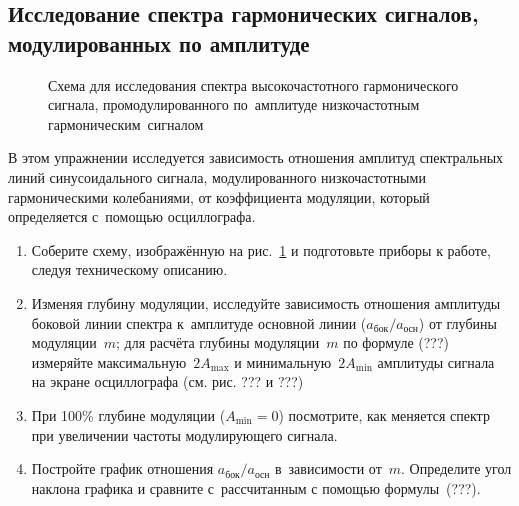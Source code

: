 \subsection*{Исследование спектра гармонических сигналов, модулированных по амплитуде}

%

\begin{figure}
	\hfill
	\hspace*{\fill}
	\label{fig:614}
	\caption{Схема для исследования спектра высокочастотного гармонического сигнала, промодулированного по~амплитуде низкочастотным гармоническим~сигналом}
\end{figure}

\begin{lab:task}
	В этом упражнении исследуется зависимость отношения амплитуд спектральных линий синусоидального сигнала, модулированного низкочастотными гармоническими колебаниями, от коэффициента модуляции, который определяется с~помощью осциллографа.
	\begin{enumerate}
		\item Соберите схему, изображённую на рис.~\ref{fig:614} и подготовьте приборы к работе, следуя техническому описанию.
		\item Изменяя глубину модуляции, исследуйте зависимость отношения амплитуды боковой линии спектра к~амплитуде основной линии ($a_{бок}/a_{осн}$) от глубины модуляции~$m$; для расчёта глубины модуляции~$m$ по формуле (???)
		измеряйте максимальную~$2A_{\max}$ и минимальную~$2A_{\min}$ амплитуды сигнала на экране осциллографа (см. рис. ??? и ???)
		\item При 100\% глубине модуляции ($A_{\min}=0$) посмотрите, как меняется спектр при увеличении частоты модулирующего сигнала.
		\item Постройте график отношения $a_{бок}/a_{осн}$ в~зависимости от~$m$. Определите угол наклона графика и сравните с~рассчитанным с помощью формулы~(???).
	\end{enumerate}
\end{lab:task}

